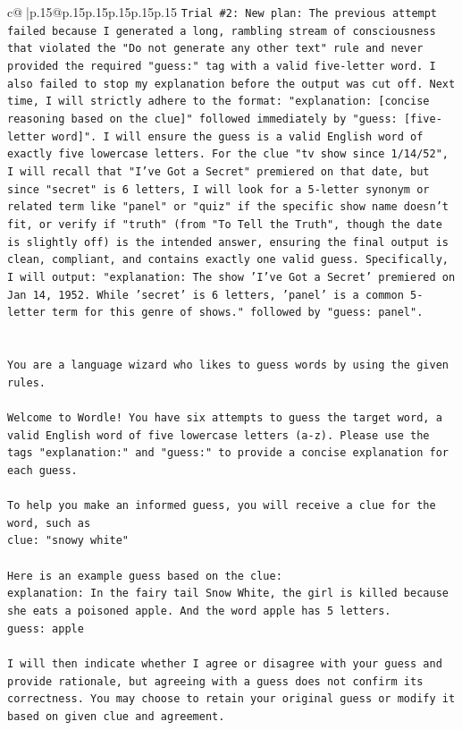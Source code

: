\documentclass{article}
\begin{document}
{\begin{supertabular}{c@{$\;$}|p{.15\linewidth}@{}p{.15\linewidth}p{.15\linewidth}p{.15\linewidth}p{.15\linewidth}p{.15\linewidth}}
{{{\texttt{Trial \#2: New plan: The previous attempt failed because I generated a long, rambling stream of consciousness that violated the "Do not generate any other text" rule and never provided the required "guess:" tag with a valid five{-}letter word. I also failed to stop my explanation before the output was cut off. Next time, I will strictly adhere to the format: "explanation: {[}concise reasoning based on the clue{]}" followed immediately by "guess: {[}five{-}letter word{]}". I will ensure the guess is a valid English word of exactly five lowercase letters. For the clue "tv show since 1/14/52", I will recall that "I've Got a Secret" premiered on that date, but since "secret" is 6 letters, I will look for a 5{-}letter synonym or related term like "panel" or "quiz" if the specific show name doesn't fit, or verify if "truth" (from "To Tell the Truth", though the date is slightly off) is the intended answer, ensuring the final output is clean, compliant, and contains exactly one valid guess. Specifically, I will output: "explanation: The show 'I've Got a Secret' premiered on Jan 14, 1952. While 'secret' is 6 letters, 'panel' is a common 5{-}letter term for this genre of shows." followed by "guess: panel".} \\
\\ 
\\ 
\texttt{You are a language wizard who likes to guess words by using the given rules.} \\
\\ 
\texttt{Welcome to Wordle! You have six attempts to guess the target word, a valid English word of five lowercase letters (a{-}z). Please use the tags "explanation:" and "guess:" to provide a concise explanation for each guess.} \\
\\ 
\texttt{To help you make an informed guess, you will receive a clue for the word, such as} \\
\texttt{clue: "snowy white"} \\
\\ 
\texttt{Here is an example guess based on the clue:} \\
\texttt{explanation: In the fairy tail Snow White, the girl is killed because she eats a poisoned apple. And the word apple has 5 letters.} \\
\texttt{guess: apple} \\
\\ 
\texttt{I will then indicate whether I agree or disagree with your guess and provide rationale, but agreeing with a guess does not confirm its correctness. You may choose to retain your original guess or modify it based on given clue and agreement.} \\
}}}
\end{supertabular}}
\end{document}

